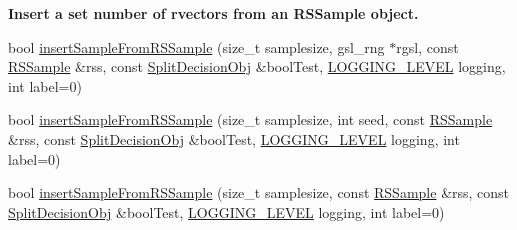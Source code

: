 \begin{Indent}{\bf \-Insert a set number of rvectors from an \-R\-S\-Sample object.}
\begin{DoxyCompactItemize}
\item 
bool \hyperlink{classsubpavings_1_1AdaptiveHistogram_ad002844c2b0ef25eeb5fbc845fd8a000}{insert\-Sample\-From\-R\-S\-Sample} (size\-\_\-t samplesize, gsl\-\_\-rng $\ast$rgsl, const \hyperlink{classRSSample}{\-R\-S\-Sample} \&rss, const \hyperlink{classsubpavings_1_1SplitDecisionObj}{\-Split\-Decision\-Obj} \&bool\-Test, \hyperlink{namespacesubpavings_aef8e51096b59ecaf1a1e9b2ee24b6089}{\-L\-O\-G\-G\-I\-N\-G\-\_\-\-L\-E\-V\-E\-L} logging, int label=0)
\item 
bool \hyperlink{classsubpavings_1_1AdaptiveHistogram_a8437c7aa645e4edc21a5bc4ec02db5ef}{insert\-Sample\-From\-R\-S\-Sample} (size\-\_\-t samplesize, int seed, const \hyperlink{classRSSample}{\-R\-S\-Sample} \&rss, const \hyperlink{classsubpavings_1_1SplitDecisionObj}{\-Split\-Decision\-Obj} \&bool\-Test, \hyperlink{namespacesubpavings_aef8e51096b59ecaf1a1e9b2ee24b6089}{\-L\-O\-G\-G\-I\-N\-G\-\_\-\-L\-E\-V\-E\-L} logging, int label=0)
\item 
bool \hyperlink{classsubpavings_1_1AdaptiveHistogram_a78dd377090622826dd80734395fba635}{insert\-Sample\-From\-R\-S\-Sample} (size\-\_\-t samplesize, const \hyperlink{classRSSample}{\-R\-S\-Sample} \&rss, const \hyperlink{classsubpavings_1_1SplitDecisionObj}{\-Split\-Decision\-Obj} \&bool\-Test, \hyperlink{namespacesubpavings_aef8e51096b59ecaf1a1e9b2ee24b6089}{\-L\-O\-G\-G\-I\-N\-G\-\_\-\-L\-E\-V\-E\-L} logging, int label=0)
\end{DoxyCompactItemize}
\end{Indent}
